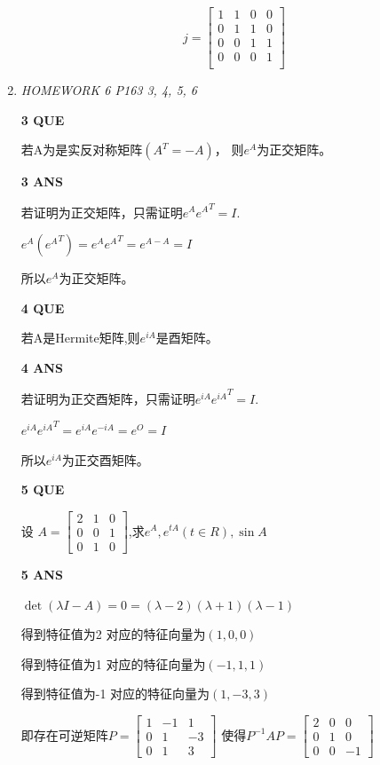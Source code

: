 \documentclass[11pt,letterpaper]{ctexart}
\begin{document}
\begin{enumerate}
\[ j = \begin{bmatrix}
	1 & 1 & 0 & 0 \\
	0 & 1 & 1 & 0 \\
	0 & 0 & 1 & 1 \\
	0 & 0 & 0 & 1 \\
\end{bmatrix}\]


\item \textit{HOMEWORK 6 {P163 3, 4, 5, 6}}%

\textbf{3 QUE}
\bigskip

若A为是实反对称矩阵$(A^T = -A)$， 则$e^A$为正交矩阵。

\textbf{3 ANS}
\bigskip

若证明为正交矩阵，只需证明$e^A {e^A}^T = I$.

$e^A({e^A}^T) = e^A {e^A}^T = e^{A - A} = I$  

所以$e^A$为正交矩阵。

\textbf{4 QUE}
\bigskip

若A是Hermite矩阵,则$e^{iA}$是酉矩阵。

\textbf{4 ANS}
\bigskip

若证明为正交酉矩阵，只需证明$e^{iA} {e^{iA}}^T = I$.

$e^{iA} {e^{iA}}^T = e^{iA} {e^{-iA}} = e^{O} = I$  

所以$e^{iA}$为正交酉矩阵。

\textbf{5 QUE}
\bigskip

设  $A = \begin{bmatrix}
	2 & 1 & 0 \\
	0 & 0 & 1 \\
	0 & 1 & 0
\end{bmatrix}$,求$e^A, e^{tA}(t \in R), \sin A$

\textbf{5 ANS}
\bigskip

$\det(\lambda I - A) =  0 = (\lambda -2)(\lambda + 1)(\lambda - 1)$

得到特征值为2 对应的特征向量为$(1, 0 ,0)$

得到特征值为1 对应的特征向量为$(-1, 1 ,1)$

得到特征值为-1 对应的特征向量为$(1, -3 ,3)$

即存在可逆矩阵$P = \begin{bmatrix}
	1 & -1 & 1 \\
	0 & 1 & -3 \\
	0 & 1 & 3
\end{bmatrix}$
使得$P^{-1}AP = \begin{bmatrix}
	2 & 0 & 0 \\
	0 & 1 & 0 \\
	0 & 0 & -1 
\end{bmatrix}$



\end{enumerate}
\end{document}
